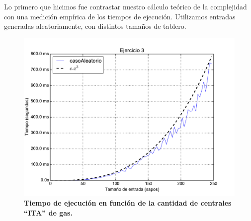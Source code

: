\documentclass[11pt, a4paper, twoside]{article}
\begin{document}
{}

Lo primero que hicimos fue contrastar nuestro cálculo teórico de la complejidad con una medición empírica de los tiempos de ejecución. Utilizamos entradas generadas aleatoriamente, con distintos tamaños de tablero. 


\begin{figure}[H]
   \begin{center}
   \includegraphics[width=1.4\textwidth,angle=90]{../ej3/graficos/test_tiempoLiso.pdf}
   \caption{\textbf{Tiempo de ejecución en función de la cantidad de centrales ``ITA'' de gas.}}
   \label{fig:ej3-graf-1}
   \end{center}
\end{figure}
\clearpage
\end{document}
